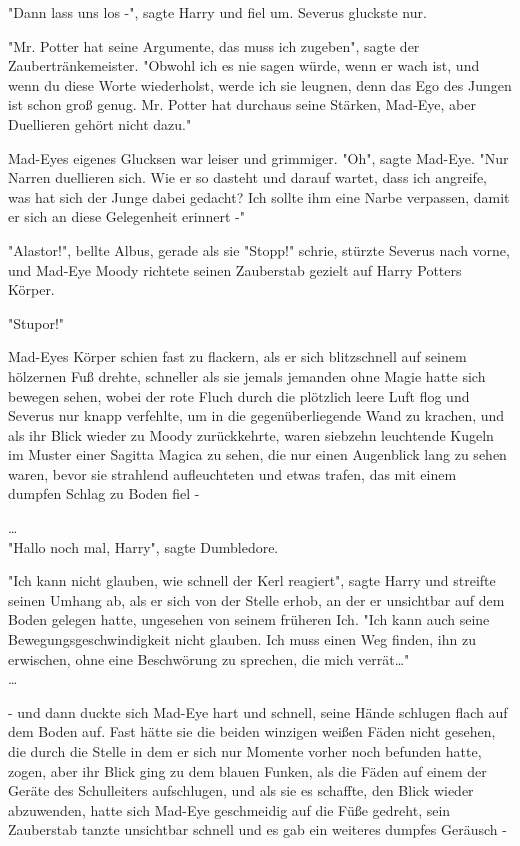 {"Dann lass uns los -", sagte Harry und fiel um. Severus gluckste nur.

"Mr. Potter hat seine Argumente, das muss ich zugeben", sagte der Zaubertränkemeister. "Obwohl ich es nie sagen würde, wenn er wach ist, und wenn du diese Worte wiederholst, werde ich sie leugnen, denn das Ego des Jungen ist schon groß genug. Mr. Potter hat durchaus seine Stärken, Mad-Eye, aber Duellieren gehört nicht dazu."

Mad-Eyes eigenes Glucksen war leiser und grimmiger. "Oh", sagte Mad-Eye. "Nur\\ Narren duellieren sich. Wie er so dasteht und darauf wartet, dass ich angreife, was hat sich der Junge dabei gedacht? Ich sollte ihm eine Narbe verpassen, damit er sich an diese Gelegenheit erinnert -"

"Alastor!", bellte Albus, gerade als sie "Stopp!" schrie, stürzte Severus nach vorne, und Mad-Eye Moody richtete seinen Zauberstab gezielt auf Harry Potters Körper.

"Stupor!"

Mad-Eyes Körper schien fast zu flackern, als er sich blitzschnell auf seinem hölzernen Fuß drehte, schneller als sie jemals jemanden ohne Magie hatte sich bewegen sehen, wobei der rote Fluch durch die plötzlich leere Luft flog und Severus nur knapp verfehlte, um in die gegenüberliegende Wand zu krachen, und als ihr Blick wieder zu Moody zurückkehrte, waren siebzehn leuchtende Kugeln im Muster einer Sagitta Magica zu sehen, die nur einen Augenblick lang zu sehen waren, bevor sie strahlend aufleuchteten und etwas trafen, das mit einem dumpfen Schlag zu Boden fiel -

…\\ "Hallo noch mal, Harry", sagte Dumbledore.

"Ich kann nicht glauben, wie schnell der Kerl reagiert", sagte Harry und streifte seinen Umhang ab, als er sich von der Stelle erhob, an der er unsichtbar auf dem Boden gelegen hatte, ungesehen von seinem früheren Ich. "Ich kann auch seine Bewegungsgeschwindigkeit nicht glauben. Ich muss einen Weg finden, ihn zu erwischen, ohne eine Beschwörung zu sprechen, die mich verrät…"\\ …

- und dann duckte sich Mad-Eye hart und schnell, seine Hände schlugen flach auf dem Boden auf. Fast hätte sie die beiden winzigen weißen Fäden nicht gesehen, die durch die Stelle in dem er sich nur Momente vorher noch befunden hatte, zogen, aber ihr Blick ging zu dem blauen Funken, als die Fäden auf einem der Geräte des Schulleiters aufschlugen, und als sie es schaffte, den Blick wieder abzuwenden, hatte sich Mad-Eye geschmeidig auf die Füße gedreht, sein Zauberstab tanzte unsichtbar schnell und es gab ein weiteres dumpfes Geräusch -

}
